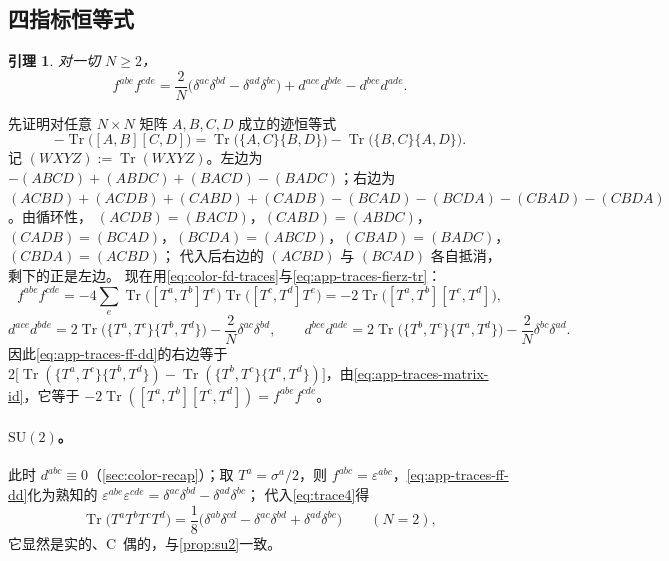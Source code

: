 \documentclass[UTF8,a4paper,11pt,fontset=fandol]{ctexart}
\makeatletter
\theoremstyle{cplain}
\newtheorem{lemma}[theorem]{引理}
\theoremstyle{cdefinition}
\theoremstyle{cremark}
\renewcommand{\proofname}{证明}
\renewenvironment{proof}[1][\proofname]{\par\pushQED{\qed}\normalfont\topsep6\p@\@plus6\p@\relax
  \trivlist\item[\hskip\labelsep\itshape #1\hspace{0.5em}]\ignorespaces}{\popQED\endtrivlist\@endpefalse}
\numberwithin{equation}{section}
\DeclareMathOperator{\Tr}{Tr}
\makeatother
\begin{document}
\subsection{四指标恒等式}\label{sec:app-traces-four}

\begin{lemma}\label{lem:app-traces-ffdd}
对一切 $N\ge2$，
\begin{equation}\label{eq:app-traces-ff-dd}
f^{abe}f^{cde}=\frac2N\bigl(\delta^{ac}\delta^{bd}-\delta^{ad}\delta^{bc}\bigr)+d^{ace}d^{bde}-d^{bce}d^{ade}.
\end{equation}
\end{lemma}

\begin{proof}
先证明对任意 $N\times N$ 矩阵 $A,B,C,D$ 成立的迹恒等式
\begin{equation}\label{eq:app-traces-matrix-id}
-\Tr\bigl([A,B][C,D]\bigr)=\Tr\bigl(\{A,C\}\{B,D\}\bigr)-\Tr\bigl(\{B,C\}\{A,D\}\bigr).
\end{equation}
记 $(WXYZ):=\Tr(WXYZ)$。左边为 $-(ABCD)+(ABDC)+(BACD)-(BADC)$；右边为
$(ACBD)+(ACDB)+(CABD)+(CADB)-(BCAD)-(BCDA)-(CBAD)-(CBDA)$。由循环性，
$(ACDB)=(BACD)$，$(CABD)=(ABDC)$，$(CADB)=(BCAD)$，$(BCDA)=(ABCD)$，$(CBAD)=(BADC)$，$(CBDA)=(ACBD)$；
代入后右边的 $(ACBD)$ 与 $(BCAD)$ 各自抵消，剩下的正是左边。
现在用\cref{eq:color-fd-traces}与\cref{eq:app-traces-fierz-tr}：
\[
f^{abe}f^{cde}=-4\sum_e\Tr\bigl([T^a,T^b]T^e\bigr)\Tr\bigl([T^c,T^d]T^e\bigr)=-2\Tr\bigl([T^a,T^b][T^c,T^d]\bigr),
\]
\[
d^{ace}d^{bde}=2\Tr\bigl(\{T^a,T^c\}\{T^b,T^d\}\bigr)-\frac2N\delta^{ac}\delta^{bd},\qquad
d^{bce}d^{ade}=2\Tr\bigl(\{T^b,T^c\}\{T^a,T^d\}\bigr)-\frac2N\delta^{bc}\delta^{ad}.
\]
因此\cref{eq:app-traces-ff-dd}的右边等于 $2\bigl[\Tr(\{T^a,T^c\}\{T^b,T^d\})-\Tr(\{T^b,T^c\}\{T^a,T^d\})\bigr]$，由\cref{eq:app-traces-matrix-id}，它等于 $-2\Tr([T^a,T^b][T^c,T^d])=f^{abe}f^{cde}$。
\end{proof}

\paragraph{$\mathrm{SU}(2)$。}此时 $d^{abc}\equiv0$（\cref{sec:color-recap}）；取 $T^a=\sigma^a/2$，则 $f^{abc}=\varepsilon^{abc}$，\cref{eq:app-traces-ff-dd}化为熟知的 $\varepsilon^{abe}\varepsilon^{cde}=\delta^{ac}\delta^{bd}-\delta^{ad}\delta^{bc}$；
代入\cref{eq:trace4}得
\begin{equation}\label{eq:app-traces-su2-trace4}
\Tr\bigl(T^aT^bT^cT^d\bigr)=\frac18\bigl(\delta^{ab}\delta^{cd}-\delta^{ac}\delta^{bd}+\delta^{ad}\delta^{bc}\bigr)\qquad(N=2),
\end{equation}
它显然是实的、C~偶的，与\cref{prop:su2}一致。
\end{document}
